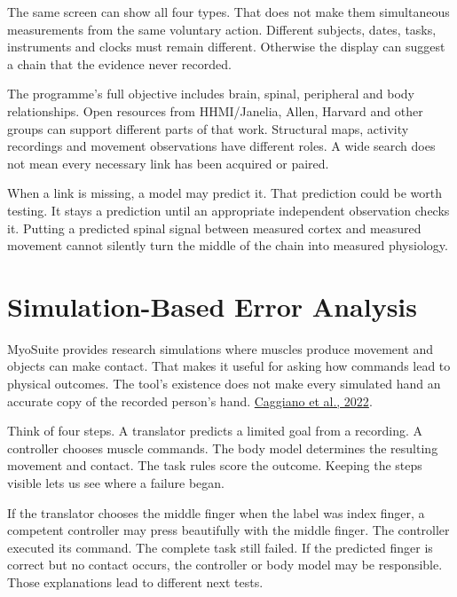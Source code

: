 The same screen can show all four types. That does not make them simultaneous measurements from the same voluntary action. Different subjects, dates, tasks, instruments and clocks must remain different. Otherwise the display can suggest a chain that the evidence never recorded.\par

The programme's full objective includes brain, spinal, peripheral and body relationships. Open resources from HHMI/Janelia, Allen, Harvard and other groups can support different parts of that work. Structural maps, activity recordings and movement observations have different roles. A wide search does not mean every necessary link has been acquired or paired.\par

When a link is missing, a model may predict it. That prediction could be worth testing. It stays a prediction until an appropriate independent observation checks it. Putting a predicted spinal signal between measured cortex and measured movement cannot silently turn the middle of the chain into measured physiology.\par

\section{Simulation-Based Error Analysis}

MyoSuite provides research simulations where muscles produce movement and objects can make contact. That makes it useful for asking how commands lead to physical outcomes. The tool's existence does not make every simulated hand an accurate copy of the recorded person's hand. \href{https://proceedings.mlr.press/v168/caggiano22a.html}{Caggiano et al., 2022}.\par

Think of four steps. A translator predicts a limited goal from a recording. A controller chooses muscle commands. The body model determines the resulting movement and contact. The task rules score the outcome. Keeping the steps visible lets us see where a failure began.\par

If the translator chooses the middle finger when the label was index finger, a competent controller may press beautifully with the middle finger. The controller executed its command. The complete task still failed. If the predicted finger is correct but no contact occurs, the controller or body model may be responsible. Those explanations lead to different next tests.\par


